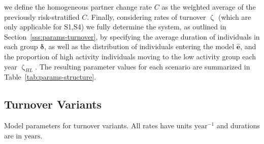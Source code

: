 \documentclass[10pt]{article}
\numberwithin{equation}{section}
\renewcommand{\zeta}{\upzeta}
\newcommand{\G}{{\mbox{\footnotesize{\textit{G}}}}}
\begin{document}
we define the homogeneous partner change rate $C$
as the weighted average of the previously risk-stratified $C$.
Finally, considering rates of turnover $\zeta$
(which are only applicable for S1,S4)
we fully determine the system, as outlined in Section~\ref{sss:params-turnover},
by specifying the average duration of individuals in each group $\bm{\delta}$,
as well as the distribution of individuals entering the model $\bm{\hat{e}}$,
and the proportion of high activity individuals moving to the low activity group each year $\zeta_{HL}$.
The resulting parameter values for each scenario
are summarized in Table~\ref{tab:params-structure}.
\subsection{Turnover Variants}\label{ss:zeta-variants}
\begin{table}
  \centering\caption{Model parameters for turnover variants.
    All rates have units $\mathrm{year}^{-1}$ and durations are in $\mathrm{years}$.}
  \label{tab:params-zeta}
  
\end{table}
%
\end{document}

